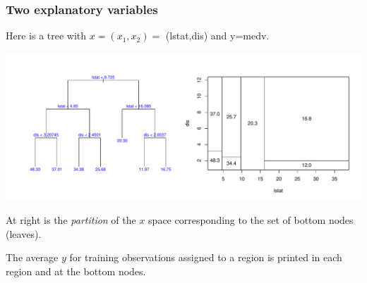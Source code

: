 \documentclass{beamer}
\newcommand{\sko}{\vspace{.1in}}
\begin{document}
\begin{frame}
\frametitle{Two explanatory variables}
Here is a tree with $x=(x_1,x_2)=$ (lstat,dis) and y=medv.\sko

\vspace{-.55in}

\begin{center}
\hspace*{-.3in} \includegraphics[scale=.4]{boston-lstat-dis-simple-tree.pdf}
\end{center}

\vspace{-.2in}

At right is the {\it partition} of the $x$ space corresponding to the set of
bottom nodes (leaves).\sko

The average $y$ for training observations assigned to a region is printed in
each region and at the bottom nodes.


\end{frame}
\end{document}
